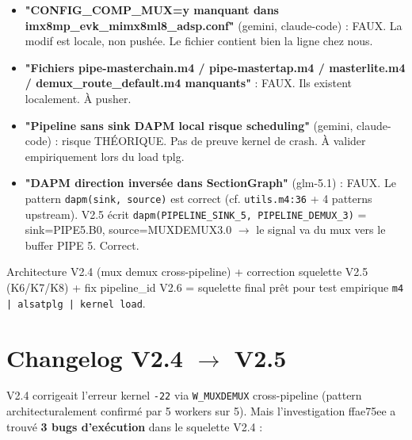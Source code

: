 \documentclass[11pt,a4paper]{article}
\begin{document}
\begin{itemize}[leftmargin=*, itemsep=1pt]
  \item \textbf{"CONFIG\_COMP\_MUX=y manquant dans imx8mp\_evk\_mimx8ml8\_adsp.conf"} (gemini, claude-code) : FAUX. La modif est locale, non pushée. Le fichier contient bien la ligne chez nous.
  \item \textbf{"Fichiers pipe-masterchain.m4 / pipe-mastertap.m4 / masterlite.m4 / demux\_route\_default.m4 manquants"} : FAUX. Ils existent localement. À pusher.
  \item \textbf{"Pipeline sans sink DAPM local risque scheduling"} (gemini, claude-code) : risque THÉORIQUE. Pas de preuve kernel de crash. À valider empiriquement lors du load tplg.
  \item \textbf{"DAPM direction inversée dans SectionGraph"} (glm-5.1) : FAUX. Le pattern \texttt{dapm(sink, source)} est correct (cf. \texttt{utils.m4:36} + 4 patterns upstream). V2.5 écrit \texttt{dapm(PIPELINE\_SINK\_5, PIPELINE\_DEMUX\_3)} = sink=PIPE5.B0, source=MUXDEMUX3.0 $\rightarrow$ le signal va du mux vers le buffer PIPE 5. Correct.
\end{itemize}

Architecture V2.4 (mux demux cross-pipeline) + correction squelette V2.5 (K6/K7/K8) + fix pipeline\_id V2.6 = squelette final prêt pour test empirique \texttt{m4 | alsatplg | kernel load}.

\clearpage

\section*{Changelog V2.4 $\rightarrow$ V2.5}

V2.4 corrigeait l'erreur kernel \texttt{-22} via \texttt{W\_MUXDEMUX} cross-pipeline (pattern architecturalement confirmé par 5 workers sur 5). Mais l'investigation ffae75ee a trouvé \textbf{3 bugs d'exécution} dans le squelette V2.4 :
\end{document}
